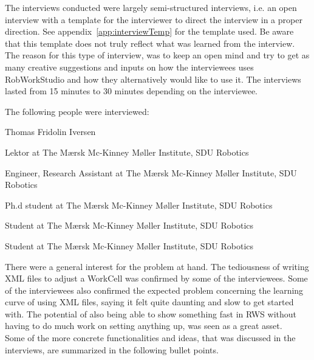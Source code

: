 The interviews conducted were largely semi-structured interviews, i.e. an open interview with a template for the interviewer to direct the interview in a proper direction. See appendix~\ref{app:interviewTemp} for the template used. Be aware that this template does not truly reflect what was learned from the interview. The reason for this type of interview, was to keep an open mind and try to get as many creative suggestions and inputs on how the interviewees uses RobWorkStudio and how they alternatively would like to use it. The interviews lasted from 15 minutes to 30 minutes depending on the interviewee.

The following people were interviewed:

\begin{labeling}{Thomas Fridolin Iversen}
\item [Lars-Peter Ellekilde] Lektor at The Mærsk Mc-Kinney Møller Institute, SDU Robotics
\item [Thomas Nicky Thuelsen] Engineer, Research Assistant at The Mærsk Mc-Kinney Møller Institute, SDU Robotics
\item [Thomas Fridolin Iversen] Ph.d student at The Mærsk Mc-Kinney Møller Institute, SDU Robotics
\item [Michael Kjær Schmidt] Student at The Mærsk Mc-Kinney Møller Institute, SDU Robotics
\item [Kristian Møller Hansen] Student at The Mærsk Mc-Kinney Møller Institute, SDU Robotics
\end{labeling}

There were a general interest for the problem at hand. The tediousness of writing XML files to adjust a WorkCell was confirmed by some of the interviewees. Some of the interviewees also confirmed the expected problem concerning the learning curve of using XML files, saying it felt quite daunting and slow to get started with. The potential of also being able to show something fast in RWS without having to do much work on setting anything up, was seen as a great asset.\\
Some of the more concrete functionalities and ideas, that was discussed in the interviews, are summarized in the following bullet points.

